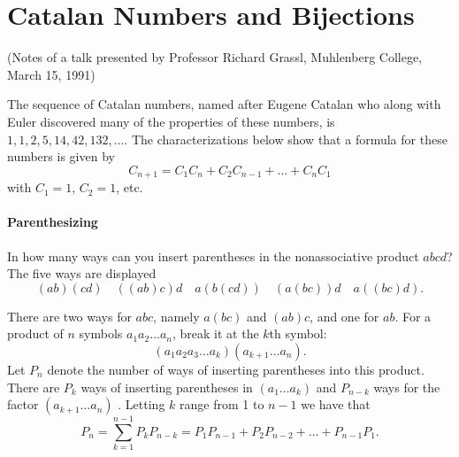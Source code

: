 \documentclass[10pt,]{book}
\theoremstyle{plain}
\theoremstyle{definition}
\theoremstyle{definition}
\theoremstyle{definition}
\theoremstyle{definition}
\numberwithin{equation}{chapter}
\begin{document}
\section[{Catalan Numbers and Bijections}]{Catalan Numbers and Bijections}\label{sec_counting-combperm}
\hypertarget{p-785}{}%
(Notes of a talk presented by Professor Richard Grassl, Muhlenberg College, March 15, 1991)%
\par
\hypertarget{p-786}{}%
The sequence of Catalan numbers, named after Eugene Catalan who along with Euler discovered many of the properties of these numbers, is \(1, 1, 2, 5, 14, 42, 132, \ldots\). The characterizations below show that a formula for these numbers is given by%
\begin{equation*}
C_{n + 1} = C_{1}C_{n} + C_{2}C_{n - 1} + \ldots + C_{n}C_{1}
\end{equation*}
with \(C_1 = 1\), \(C_2 = 1\), etc.%
\typeout{************************************************}
\typeout{************************************************}
\paragraph[{Parenthesizing}]{Parenthesizing}\hypertarget{paragraphs-7}{}
\hypertarget{p-787}{}%
In how many ways can you insert parentheses in the nonassociative product \(abcd\)? The five ways are displayed%
\begin{equation*}
(ab)(cd)\quad ((ab)c)d \quad a(b(cd)) \quad (a(bc))d \quad a((bc)d).
\end{equation*}
%
\par
\hypertarget{p-788}{}%
There are two ways for \(abc\), namely \(a(bc)\) and \((ab)c\), and one for \(ab\). For a product of \(n\) symbols \(a_{1}a_{2}\ldots a_{n}\), break it at the \(k\)th symbol:%
\begin{equation*}
(a_{1}a_{2}a_{3}\ldots a_{k})(a_{k + 1}\ldots a_{n}).
\end{equation*}
Let \(P_{n}\) denote the number of ways of inserting parentheses into this product. There are \(P_k\) ways of inserting parentheses in \(\left(a_{1}\ldots a_{k} \right)\) and \(P_{n - k}\) ways for the factor \((a_{k + 1}\ldots a_{n})\) . Letting \(k\) range from 1 to \(n - 1\) we have that%
\begin{equation*}
P_{n} = \sum_{k = 1}^{n - 1} P_{k}P_{n - k} = P_{1}P_{n - 1} + P_{2}P_{n - 2} + \ldots + P_{n - 1}P_{1}.
\end{equation*}
%
\typeout{************************************************}
\typeout{************************************************}
\end{document}
